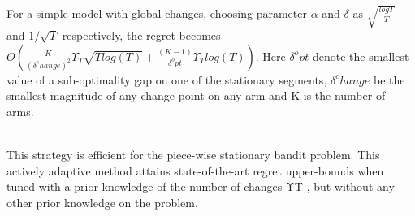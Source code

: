 \\For a simple model with global changes, choosing parameter $\alpha$ and $\delta $ as $\sqrt{\frac{logT}{T}}$ and $1/\sqrt{T}$ respectively, the regret becomes $O(\frac{K}{(\delta^change)^2} \Upsilon_T \sqrt{T log(T)}+\frac{(K-1)}{\delta^opt} \Upsilon_T log(T))$. Here $\delta^opt$ denote the smallest value of a sub-optimality gap on one of the stationary segments, $\delta^change$ be the smallest magnitude of any change point on any arm and K is the number of arms.
\citep{Besson2019}


\\This strategy is efficient for the piece-wise stationary bandit problem. This actively adaptive method attains state-of-the-art regret upper-bounds when tuned with a prior knowledge of the number of changes ΥT , but without any other prior knowledge on the problem.\citep{Besson2019}